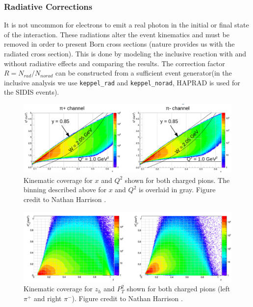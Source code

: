 \subsubsection{Radiative Corrections}
It is not uncommon for electrons to emit a real photon in the initial or final state of the interaction.  These radiations alter the event kinematics and must be removed in order to present Born cross sections (nature provides us with the radiated cross section).  This is done by modeling the inclusive reaction with and without radiative effects and comparing the results.  The correction factor $R = N_{rad}/N_{no rad}$ can be constructed from a sufficient event generator(in the inclusive analysis we use \texttt{keppel\_rad} and \texttt{keppel\_norad}, HAPRAD is used for the SIDIS events).  

\begin{figure}
  \centering 

  \includegraphics[width=14cm]{image/nathan-xq2.png}
  \caption{Kinematic coverage for $x$ and $Q^2$ shown for both charged pions.  The binning described above for $x$ and $Q^2$ is overlaid in gray.  Figure credit to Nathan Harrison \cite{theses-harrison:2015}.}

\end{figure}

\begin{figure}
  \centering 

  \includegraphics[width=14cm]{image/nathan-zpt.png}
  \caption{Kinematic coverage for $z_h$ and $P_{T}^{2}$ shown for both charged pions (left $\pi^+$ and right $\pi^-$).  Figure credit to Nathan Harrison \cite{theses-harrison:2015}.}

\end{figure}

